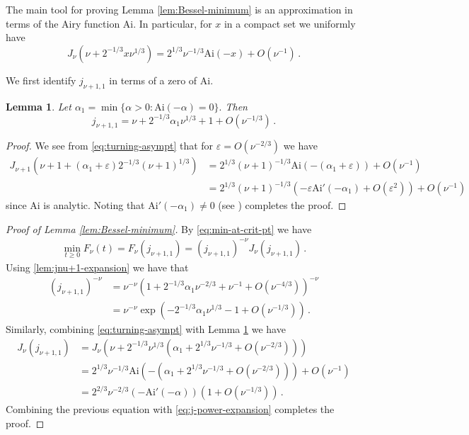 \documentclass[10pt]{amsart}
\newtheorem{lemma}[theorem]{Lemma}
\theoremstyle{definition}
\theoremstyle{remark}
\def\eps{{\varepsilon}}
\newcommand{\Ai}{\mathrm{Ai}}
\begin{document}
	
	
	
	
	
	The main tool for proving Lemma \ref{lem:Bessel-minimum} is an approximation in terms of the Airy function $\mathrm{Ai}$.  In particular, for $x$ in a compact set we uniformly have \cite[Eq.~10.21.44]{handook2010} \begin{equation}\label{eq:turning-asympt}
		J_\nu(\nu + 2^{-1/3} x \nu^{1/3}) = 2^{1/3}\nu^{-1/3} \Ai(-x) + O(\nu^{-1})\,.
	\end{equation}
	
	
	We first identify $j_{\nu+1,1}$ in terms of a zero of $\Ai$. \begin{lemma}\label{lem:jnu+1-expansion}
		Let $\alpha_1 = \min\{\alpha > 0 : \Ai(-\alpha) = 0\}.$  Then $$j_{\nu+1,1} = \nu+ 2^{-1/3} \alpha_1 \nu^{1/3} + 1 + O(\nu^{-1/3})\,.$$
	\end{lemma}
	\begin{proof}
		We see from \eqref{eq:turning-asympt} that for $\eps = O(\nu^{-2/3})$ we have \begin{align*}
			J_{\nu+1}(\nu+1 + (\alpha_1+ \eps)2^{-1/3}(\nu+1)^{1/3}) &= 2^{1/3} (\nu+1)^{-1/3}\Ai(-(\alpha_1 + \eps)) + O(\nu^{-1}) \\
			&=2^{1/3} (\nu+1)^{-1/3} \left( - \eps\Ai'(-\alpha_1) + O(\eps^2)\right) + O(\nu^{-1})
		\end{align*}
		since $\Ai$ is analytic.  Noting that $\Ai'(-\alpha_1) \neq 0$ (see \cite[Eq.~9.9.3]{handook2010}) completes the proof.
	\end{proof}
	
	\begin{proof}[Proof of Lemma \ref{lem:Bessel-minimum}]
		By \eqref{eq:min-at-crit-pt} we have \begin{align*}
			\min_{t \geq 0} F_\nu(t) = F_\nu(j_{\nu+1,1}) = (j_{\nu+1,1})^{-\nu} J_\nu(j_{\nu+1,1})\,.
		\end{align*}
		Using \eqref{lem:jnu+1-expansion} we have that \begin{align}
			(j_{\nu+1,1})^{-\nu} &= \nu^{-\nu} \left(1 + 2^{-1/3}\alpha_1 \nu^{-2/3} + \nu^{-1} + O(\nu^{-4/3})\right)^{-\nu} \nonumber \\
			&= \nu^{-\nu} \exp\left( -2^{-1/3}\alpha_1 \nu^{1/3} - 1 + O(\nu^{-1/3})\right)\,.\label{eq:j-power-expansion}
		\end{align}
		Similarly, combining \eqref{eq:turning-asympt} with Lemma \ref{lem:jnu+1-expansion} we have \begin{align*}
			J_\nu(j_{\nu+1,1}) &= J_\nu\left( \nu + 2^{-1/3} \nu^{1/3}\left(\alpha_1 + 2^{1/3}\nu^{-1/3} + O(\nu^{-2/3}) \right)  \right) \\
			&= 2^{1/3} \nu^{-1/3} \Ai\left(-\left(\alpha_1 + 2^{1/3}\nu^{-1/3} + O(\nu^{-2/3}) \right) \right) + O(\nu^{-1}) \\
			&= 2^{2/3} \nu^{-2/3} \left(-\Ai'(-\alpha)\right)(1 + O(\nu^{-1/3}))\,.
		\end{align*}
		Combining the previous equation with \eqref{eq:j-power-expansion} completes the proof.
	\end{proof}
	
	
	
\end{document}
